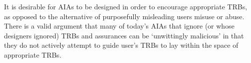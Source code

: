     It is desirable for AIAs to be designed in order to encourage appropriate TRBs, as opposed to the alternative of purposefully misleading users misuse or abuse. There is a valid argument that many of today's AIAs that ignore (or whose designers ignored) TRBs and assurances can be `unwittingly malicious' in that they do not actively attempt to guide user's TRBs to lay within the space of appropriate TRBs.


